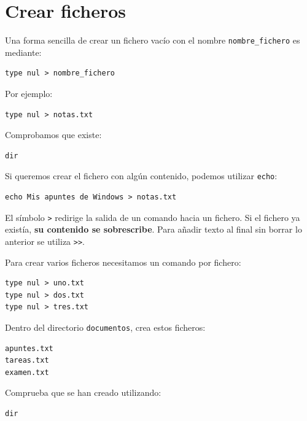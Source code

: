 \documentclass[11pt,a4paper]{article}
\begin{document}
\section{Crear ficheros}

Una forma sencilla de crear un fichero vacío con el nombre
\texttt{nombre\_fichero} es mediante:

\begin{lstlisting}
type nul > nombre_fichero
\end{lstlisting}

\noindent Por ejemplo:

\begin{lstlisting}
type nul > notas.txt
\end{lstlisting}

\noindent Comprobamos que existe:

\begin{lstlisting}
dir
\end{lstlisting}

\noindent Si queremos crear el fichero con algún contenido, podemos
utilizar \texttt{echo}:

\begin{lstlisting}
echo Mis apuntes de Windows > notas.txt
\end{lstlisting}

\begin{importante}
El símbolo \texttt{>} redirige la salida de un comando hacia un
fichero. Si el fichero ya existía, \textbf{su contenido se
sobrescribe}. Para añadir texto al final sin borrar lo anterior se
utiliza \texttt{>}\texttt{>}.
\end{importante}

\noindent Para crear varios ficheros necesitamos un comando por
fichero:

\begin{lstlisting}
type nul > uno.txt
type nul > dos.txt
type nul > tres.txt
\end{lstlisting}

\begin{ejercicio}
Dentro del directorio \texttt{documentos}, crea estos ficheros:

\begin{lstlisting}
apuntes.txt
tareas.txt
examen.txt
\end{lstlisting}

Comprueba que se han creado utilizando:

\begin{lstlisting}
dir
\end{lstlisting}
\end{ejercicio}
\end{document}
